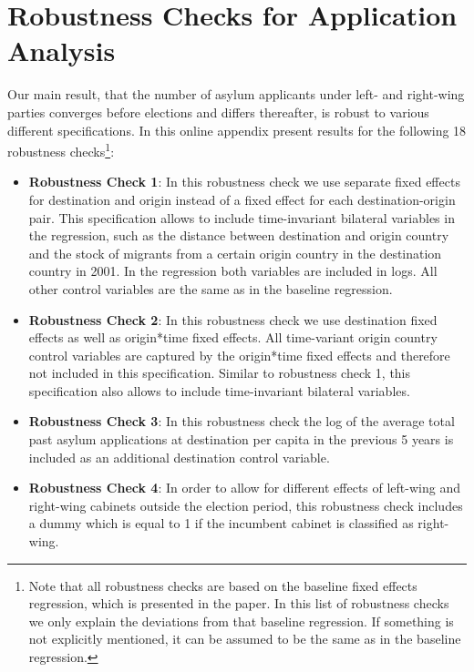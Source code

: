 \documentclass[11pt,a4paper]{scrartcl}
\begin{document}
\section{Robustness Checks for Application Analysis}
Our main result, that the number of asylum applicants under left- and right-wing parties converges before elections and differs thereafter,  is robust to various different specifications. In this online appendix present results for the following 18 robustness checks\footnote{Note that all robustness checks are based on the baseline fixed effects regression, which is presented in the paper. In this list of robustness checks we only explain the deviations from that baseline regression. If something is not explicitly mentioned, it can be assumed to be the same as in the baseline regression.}:
\begin{itemize}
	\item \textbf{Robustness Check 1}: In this robustness check we use separate fixed effects for destination and origin instead of a fixed effect for each destination-origin pair. This specification allows to include time-invariant bilateral variables in the regression, such as the distance between destination and origin country and the stock of migrants from a certain origin country in the destination country in 2001. In the regression both variables are included in logs. All other control variables are the same as in the baseline regression.  
	
	\item \textbf{Robustness Check 2}: In this robustness check we use destination fixed effects as well as origin*time fixed effects. All time-variant origin country control variables are captured by the origin*time fixed effects and therefore not included in this specification. Similar to robustness check 1, this specification also allows to include time-invariant bilateral variables.  
	
	\item \textbf{Robustness Check 3}: In this robustness check the log of the average total past asylum applications at destination per capita in the previous 5 years is included as an additional destination control variable. 
	
	\item \textbf{Robustness Check 4}: In order to allow for different effects of left-wing and right-wing cabinets outside the election period, this robustness check includes a dummy which is equal to 1 if the incumbent cabinet is classified as right-wing.   
	

\end{itemize}
\end{document}
